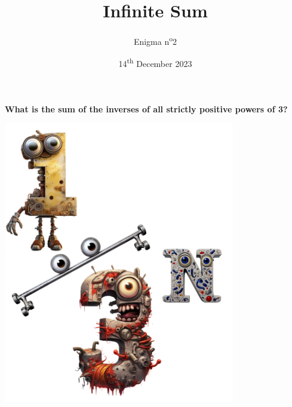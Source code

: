 \documentclass[a4paper, top=10mm]{article}
\title{\textbf{\huge{Infinite Sum}}}
\author{Enigma n\textsuperscript{o}2}
\date{14\textsuperscript{th} December 2023}
\begin{document}
	\maketitle
	
	\vspace{3cm}
	
	\Huge{\textbf{What is the sum of the inverses of all strictly positive powers of 3?}}
	
	\vspace{3cm}
	
	\begin{center}
		\includegraphics[height=350pt]{02_one_third_character.png}
	\end{center}
	
	
\end{document}
